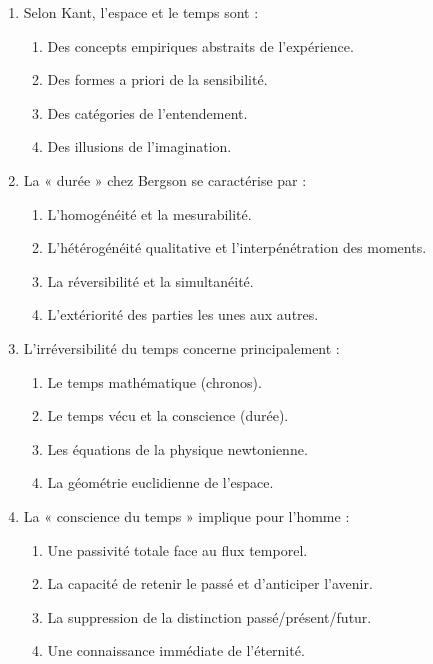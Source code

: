 \documentclass[11pt]{article}
\begin{document}
\begin{exercice}
\begin{enumerate}
    \item Selon Kant, l'espace et le temps sont :
    \begin{enumerate}
        \item Des concepts empiriques abstraits de l'expérience.
        \item Des formes a priori de la sensibilité.
        \item Des catégories de l'entendement.
        \item Des illusions de l'imagination.
    \end{enumerate}
    \item La « durée » chez Bergson se caractérise par :
    \begin{enumerate}
        \item L'homogénéité et la mesurabilité.
        \item L'hétérogénéité qualitative et l'interpénétration des moments.
        \item La réversibilité et la simultanéité.
        \item L'extériorité des parties les unes aux autres.
    \end{enumerate}
    \item L'irréversibilité du temps concerne principalement :
    \begin{enumerate}
        \item Le temps mathématique (chronos).
        \item Le temps vécu et la conscience (durée).
        \item Les équations de la physique newtonienne.
        \item La géométrie euclidienne de l'espace.
    \end{enumerate}
    \item La « conscience du temps » implique pour l'homme :
    \begin{enumerate}
        \item Une passivité totale face au flux temporel.
        \item La capacité de retenir le passé et d'anticiper l'avenir.
        \item La suppression de la distinction passé/présent/futur.
        \item Une connaissance immédiate de l'éternité.
    \end{enumerate}
\end{enumerate}
\end{exercice}
\end{document}
